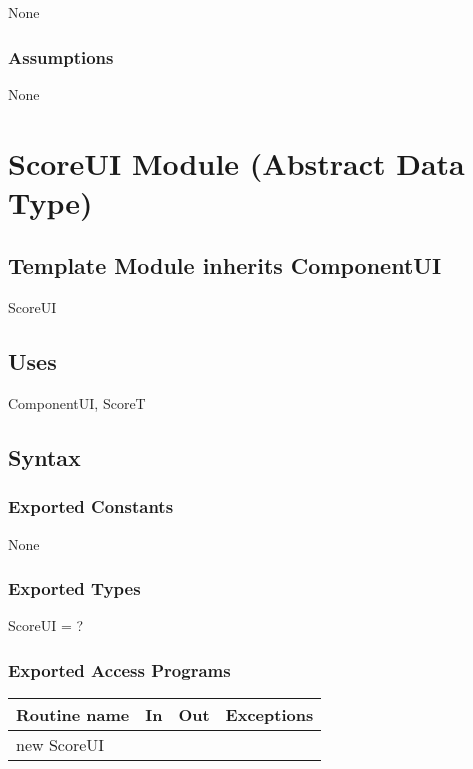 \documentclass[12pt]{article}
\begin{document}
None

\subsubsection* {Assumptions}

None

\newpage

\section* {ScoreUI Module (Abstract Data Type)}

\subsection*{Template Module inherits ComponentUI}

ScoreUI

\subsection* {Uses}

ComponentUI, ScoreT

\subsection* {Syntax}

\subsubsection* {Exported Constants}

None

\subsubsection* {Exported Types}

ScoreUI = ?

\subsubsection* {Exported Access Programs}

\begin{tabular}{| l | l | l | p{6cm} |}
\hline
\textbf{Routine name} & \textbf{In} & \textbf{Out} & \textbf{Exceptions}\\
\hline
new ScoreUI & & &  \\
\hline
\end{tabular}
\end{document}
